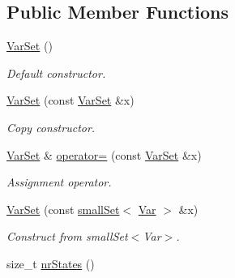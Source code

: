 \subsection*{Public Member Functions}
\begin{CompactItemize}
\item 
\hypertarget{classdai_1_1VarSet_933a982d2d7f8c2f796610ab351d728b}{
\hyperlink{classdai_1_1VarSet_933a982d2d7f8c2f796610ab351d728b}{VarSet} ()}
\label{classdai_1_1VarSet_933a982d2d7f8c2f796610ab351d728b}

\begin{CompactList}\small\item\em Default constructor. \item\end{CompactList}\item 
\hypertarget{classdai_1_1VarSet_547ebf0ada78ea9baa2ad3f0c6225206}{
\hyperlink{classdai_1_1VarSet_547ebf0ada78ea9baa2ad3f0c6225206}{VarSet} (const \hyperlink{classdai_1_1VarSet}{VarSet} \&x)}
\label{classdai_1_1VarSet_547ebf0ada78ea9baa2ad3f0c6225206}

\begin{CompactList}\small\item\em Copy constructor. \item\end{CompactList}\item 
\hypertarget{classdai_1_1VarSet_3a551f98ea573b932042d393e5414c15}{
\hyperlink{classdai_1_1VarSet}{VarSet} \& \hyperlink{classdai_1_1VarSet_3a551f98ea573b932042d393e5414c15}{operator=} (const \hyperlink{classdai_1_1VarSet}{VarSet} \&x)}
\label{classdai_1_1VarSet_3a551f98ea573b932042d393e5414c15}

\begin{CompactList}\small\item\em Assignment operator. \item\end{CompactList}\item 
\hypertarget{classdai_1_1VarSet_c15195c92c88c8f9f477dafab47937af}{
\hyperlink{classdai_1_1VarSet_c15195c92c88c8f9f477dafab47937af}{VarSet} (const \hyperlink{classdai_1_1smallSet}{smallSet}$<$ \hyperlink{classdai_1_1Var}{Var} $>$ \&x)}
\label{classdai_1_1VarSet_c15195c92c88c8f9f477dafab47937af}

\begin{CompactList}\small\item\em Construct from smallSet$<$Var$>$. \item\end{CompactList}\item 
\hypertarget{classdai_1_1VarSet_adfd4d43a9a521f8738e9507682440d3}{
size\_\-t \hyperlink{classdai_1_1VarSet_adfd4d43a9a521f8738e9507682440d3}{nrStates} ()}
\label{classdai_1_1VarSet_adfd4d43a9a521f8738e9507682440d3}


\end{CompactItemize}

